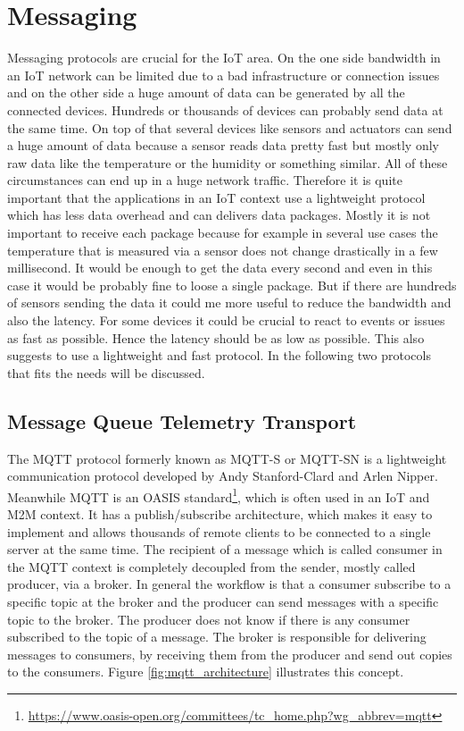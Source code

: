 \section{Messaging}
Messaging protocols are crucial for the \ac{IoT} area.
On the one side bandwidth in an \ac{IoT} network can be limited due to a bad infrastructure or connection issues and on the other side a huge amount of data can be generated by all the connected devices.
Hundreds or thousands of devices can probably send data at the same time.
On top of that several devices like sensors and actuators can send a huge amount of data because a sensor reads data pretty fast but mostly only raw data like the temperature or the humidity or something similar.
All of these circumstances can end up in a huge network traffic.
Therefore it is quite important that the applications in an \ac{IoT} context use a lightweight protocol which has less data overhead and can delivers data packages.
Mostly it is not important to receive each package because for example in several use cases the temperature that is measured via a sensor does not change drastically in a few millisecond.
It would be enough to get the data every second and even in this case it would be probably fine to loose a single package.
But if there are hundreds of sensors sending the data it could me more useful to reduce the bandwidth and also the latency.
For some devices it could be crucial to react to events or issues as fast as possible.
Hence the latency should be as low as possible.
This also suggests to use a lightweight and fast protocol.
In the following two protocols that fits the needs will be discussed.

\subsection{Message Queue Telemetry Transport}
\label{section:MQTT}
The \ac{MQTT} protocol formerly known as MQTT-S or MQTT-SN is a lightweight communication protocol developed by Andy Stanford-Clard and Arlen Nipper.\autocite[cf.]{MQTT:FAQ}
Meanwhile \ac{MQTT} is an \ac{OASIS} standard\footnote{\url{https://www.oasis-open.org/committees/tc_home.php?wg_abbrev=mqtt}}, which is often used in an \ac{IoT} and \ac{M2M} context.\autocite[cf.][p. 5]{lampkin:2012:mqtt}
It has a publish/subscribe architecture, which makes it easy to implement and allows thousands of remote clients to be connected to a single server at the same time.\autocite[cf.][p. 5]{lampkin:2012:mqtt}
The recipient of a message which is called consumer in the \ac{MQTT} context is completely decoupled from the sender, mostly called producer, via a broker.
In general the workflow is that a consumer subscribe to a specific topic at the broker and the producer can send messages with a specific topic to the broker.
The producer does not know if there is any consumer subscribed to the topic of a message.
The broker is responsible for delivering messages to consumers, by receiving them from the producer and send out copies to the consumers.
Figure \ref{fig:mqtt_architecture} illustrates this concept.

